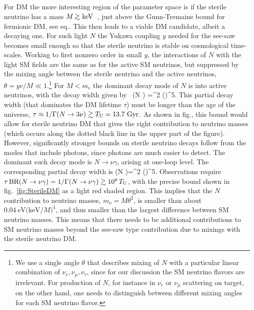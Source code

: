 For DM the more interesting region of the parameter space is if the sterile neutrino has a mass $M \circa{>}\keV$~\cite{SterileNu},
just above the Gunn-Tremaine bound for fermionic DM, see eq.. 
This then leads to a viable DM candidate, albeit a decaying one.
For such light $N$ the Yukawa coupling $y$ needed for the see-saw
becomes small enough so that the sterile neutrino is stable on cosmological time-scales. Working to first nonzero order in small $y$, 
the interactions of $N$ with the light SM fields are the same as for the active SM neutrinos, but suppressed by the mixing angle between the sterile neutrino and the active neutrinos, $\theta = y v/M \ll1$.\footnote{We use a single angle $\theta$ that describes mixing of $N$ with a particular linear combination of $\nu_e, \nu_\mu, \nu_\tau$, since for our discussion the SM neutrino flavors are irrelevant. For production of $N$, for instance in $\nu_e$ or $\nu_\mu$ scattering on target, on the other hand, one needs to distinguish between different mixing angles for each SM neutrino flavor.}
For $M < m_e$  the dominant decay mode of $N$ is into active neutrinos, with the decay width given by~\cite{nustau}
\beq\Gamma(N \nu) =\theta^2 \approx {} \left(\right)^5.\eeq
This partial decay width (that dominates the DM lifetime $\tau$)
must be longer than the age of the universe,
$ \tau \approx 1/\Gamma(N\to 3\nu) \gtrsim T_{\rm U}=13.7~{\rm Gyr}$.
As shown in fig., this bound would allow for sterile neutrino DM that gives the right contribution to neutrino masses (which occurs along the dotted black line in the upper part of the figure).
However, significantly stronger bounds on sterile neutrino decays follow from the modes that include photons,
since photons are much easier to detect.
The dominant such decay mode is $N\to \nu\gamma$, arising at one-loop level. 
The corresponding partial decay width is
\beq\label{eq:N->nugamma}
\Gamma(N \to \nu \gamma)=\theta^2 
 \approx {}  \bigg(\bigg)^5.\eeq
Observations require  $\tau \, \hbox{BR}(N \to \nu \gamma)=1/\Gamma(N \to \nu \gamma)\gtrsim 10^8 \,T_{\rm U}$,
with the precise bound shown in fig.~\ref{fig:SterileDM} as a light red shaded region.
This implies that the $N$ contribution to neutrino masses, $m_\nu = M \theta^2 $, 
is smaller than about $0.04\ \text{eV}\big(\text{keV}/M\big)^4$, and thus smaller than the largest difference between SM neutrino masses. This means that there needs to be additional contributions to SM neutrino masses beyond the see-saw type contribution due to mixings with the sterile neutrino DM. 


